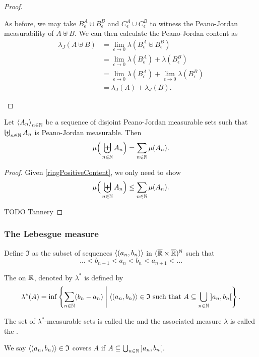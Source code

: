 \begin{proof}
\begin{itemize}
As before, we may take $B_\epsilon^A\uplus B_\epsilon^B$ and $C_\epsilon^A \cup C_\epsilon^B$ to witness the Peano-Jordan measurability of $A\uplus B$. We can then calculate the Peano-Jordan content as
\begin{align*}
\lambda_J(A\uplus B) &= \lim_{\epsilon \to 0}\lambda(B_\epsilon^A\uplus B_\epsilon^B) \\
&= \lim_{\epsilon \to 0}\lambda(B_\epsilon^A) + \lambda(B_\epsilon^B) \\
&= \lim_{\epsilon \to 0}\lambda(B_\epsilon^A) + \lim_{\epsilon \to 0}\lambda(B_\epsilon^B) \\
&= \lambda_J(A) + \lambda_J(B).
\end{align*}
\end{itemize}
\end{proof}

\begin{proposition}
Let $\left\langle A_n \right\rangle_{n\in \mathbb{N}}$ be a sequence of disjoint Peano-Jordan measurable sets such that $\biguplus_{n\in\mathbb{N}}A_n$ is Peano-Jordan measurable. Then
\[ \mu\Big(\biguplus_{n\in\mathbb{N}}A_n\Big) = \sum_{n\in\mathbb{N}}\mu(A_n). \]
\end{proposition}
\begin{proof}
Given \ref{ringPositiveContent}, we only need to show
\[ \mu\Big(\biguplus_{n\in\mathbb{N}}A_n\Big) \leq \sum_{n\in\mathbb{N}}\mu(A_n). \]

TODO Tannery
\end{proof}

\subsubsection{The Lebesgue measure}
\begin{definition}
Define $\mathfrak{I}$ as the subset of sequences $\left\langle (a_n,b_n) \right\rangle$ in $(\overline{\mathbb{R}}\times\overline{\mathbb{R}})^{\mathbb{N}}$ such that
\[ \ldots < b_{n-1}< a_n < b_n < a_{n+1} < \ldots \]

The  on $\mathbb{R}$, denoted by $\lambda^*$ is defined by
\[ \lambda^*(A) = \inf\setbuilder{\sum_{n\in \N}(b_n-a_n)}{\text{$\seq{(a_n,b_n)}\in \mathfrak{I}$ such that $A \subseteq \bigcup_{n\in\N} \interval[o]{a_n, b_n}$}}. \]

The set of $\lambda^*$-measurable sets is called the  and the associated measure $\lambda$ is called the .
\end{definition}
We say $\left\langle (a_n,b_n) \right\rangle\in \mathfrak{I}$ covers $A$ if $A \subseteq \bigcup_{n\in\N} \interval[o]{a_n, b_n}$.

